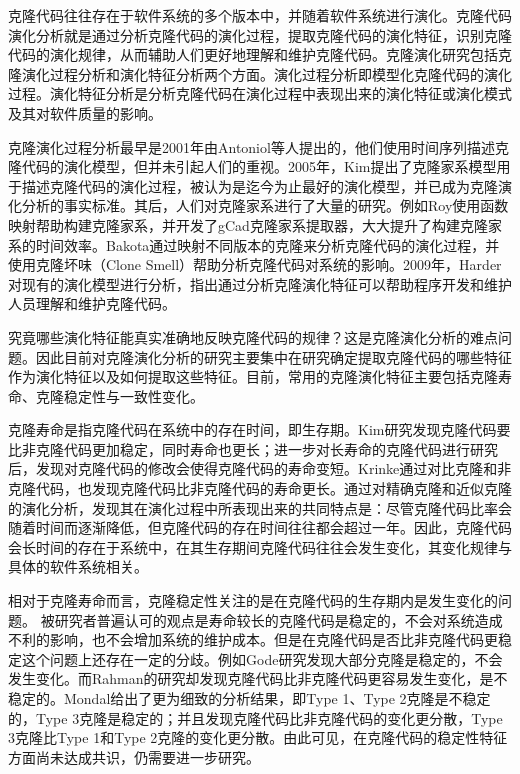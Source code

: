 
克隆代码往往存在于软件系统的多个版本中，并随着软件系统进行演化。克隆代码演化分析就是通过分析克隆代码的演化过程，提取克隆代码的演化特征，识别克隆代码的演化规律，从而辅助人们更好地理解和维护克隆代码。克隆演化研究包括克隆演化过程分析和演化特征分析两个方面。演化过程分析即模型化克隆代码的演化过程。演化特征分析是分析克隆代码在演化过程中表现出来的演化特征或演化模式及其对软件质量的影响。

克隆演化过程分析最早是2001年由Antoniol等人提出的，他们使用时间序列描述克隆代码的演化模型\cite{antoniol2001modeling}，但并未引起人们的重视。2005年，Kim提出了克隆家系模型用于描述克隆代码的演化过程，被认为是迄今为止最好的演化模型，并已成为克隆演化分析的事实标准\cite{kim2005empirical}。其后，人们对克隆家系进行了大量的研究。例如Roy使用函数映射帮助构建克隆家系，并开发了gCad克隆家系提取器，大大提升了构建克隆家系的时间效率\cite{saha2011automatic}。Bakota通过映射不同版本的克隆来分析克隆代码的演化过程，并使用克隆坏味（Clone Smell）帮助分析克隆代码对系统的影响\cite{bakota2011tracking}。2009年，Harder对现有的演化模型进行分析\cite{harder2009modeling}，指出通过分析克隆演化特征可以帮助程序开发和维护人员理解和维护克隆代码。

究竟哪些演化特征能真实准确地反映克隆代码的规律？这是克隆演化分析的难点问题。因此目前对克隆演化分析的研究主要集中在研究确定提取克隆代码的哪些特征作为演化特征以及如何提取这些特征。目前，常用的克隆演化特征主要包括克隆寿命、克隆稳定性与一致性变化。

克隆寿命是指克隆代码在系统中的存在时间，即生存期。Kim研究发现克隆代码要比非克隆代码更加稳定，同时寿命也更长\cite{kim2005empirical}；进一步对长寿命的克隆代码进行研究后，发现对克隆代码的修改会使得克隆代码的寿命变短\cite{cai2011empirical}。Krinke通过对比克隆和非克隆代码，也发现克隆代码比非克隆代码的寿命更长\cite{krinke2011cloned}。通过对精确克隆和近似克隆的演化分析，发现其在演化过程中所表现出来的共同特点是：尽管克隆代码比率会随着时间而逐渐降低，但克隆代码的存在时间往往都会超过一年\cite{bazrafshan2012evolution}。因此，克隆代码会长时间的存在于系统中，在其生存期间克隆代码往往会发生变化，其变化规律与具体的软件系统相关\cite{gode2009evolution}。

相对于克隆寿命而言，克隆稳定性关注的是在克隆代码的生存期内是发生变化的问题。
被研究者普遍认可的观点是寿命较长的克隆代码是稳定的\cite{krinke2008cloned}\cite{gode2011clone}\cite{harder2013cloned}，不会对系统造成不利的影响，也不会增加系统的维护成本。但是在克隆代码是否比非克隆代码更稳定这个问题上还存在一定的分歧。例如Gode研究发现大部分克隆是稳定的，不会发生变化\cite{gode2011frequency}。而Rahman的研究却发现克隆代码比非克隆代码更容易发生变化，是不稳定的\cite{rahman2014change}。Mondal给出了更为细致的分析结果，即Type 1、Type 2克隆是不稳定的，Type 3克隆是稳定的；并且发现克隆代码比非克隆代码的变化更分散，Type 3克隆比Type 1和Type 2克隆的变化更分散\cite{mondal2012comparative}\cite{mondal2012dispersion}。由此可见，在克隆代码的稳定性特征方面尚未达成共识，仍需要进一步研究。

